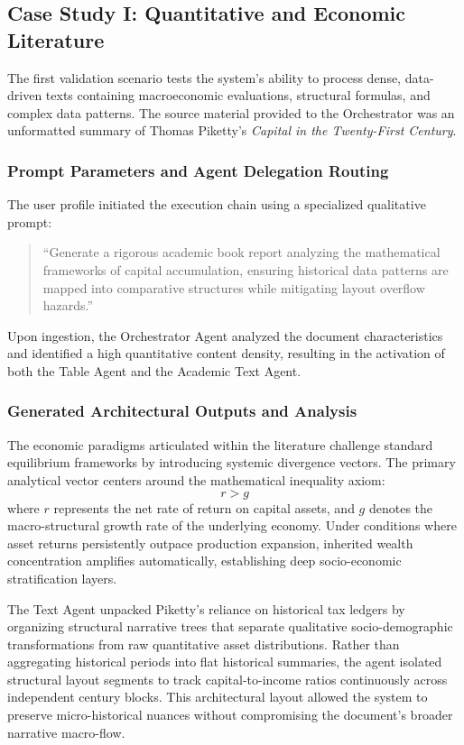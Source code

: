 \subsection{Case Study I: Quantitative and Economic Literature}
The first validation scenario tests the system's ability to process dense, data-driven texts containing macroeconomic evaluations, structural formulas, and complex data patterns. The source material provided to the Orchestrator was an unformatted summary of Thomas Piketty's \textit{Capital in the Twenty-First Century}.

\subsubsection{Prompt Parameters and Agent Delegation Routing}
The user profile initiated the execution chain using a specialized qualitative prompt:
\begin{quote}
``Generate a rigorous academic book report analyzing the mathematical frameworks of capital accumulation, ensuring historical data patterns are mapped into comparative structures while mitigating layout overflow hazards.''
\end{quote}

Upon ingestion, the Orchestrator Agent analyzed the document characteristics and identified a high quantitative content density, resulting in the activation of both the Table Agent and the Academic Text Agent.

\subsubsection{Generated Architectural Outputs and Analysis}
The economic paradigms articulated within the literature challenge standard equilibrium frameworks by introducing systemic divergence vectors. The primary analytical vector centers around the mathematical inequality axiom:
\begin{equation}
r > g
\end{equation}
where \(r\) represents the net rate of return on capital assets, and \(g\) denotes the macro-structural growth rate of the underlying economy. Under conditions where asset returns persistently outpace production expansion, inherited wealth concentration amplifies automatically, establishing deep socio-economic stratification layers.

The Text Agent unpacked Piketty's reliance on historical tax ledgers by organizing structural narrative trees that separate qualitative socio-demographic transformations from raw quantitative asset distributions. Rather than aggregating historical periods into flat historical summaries, the agent isolated structural layout segments to track capital-to-income ratios continuously across independent century blocks. This architectural layout allowed the system to preserve micro-historical nuances without compromising the document's broader narrative macro-flow.

